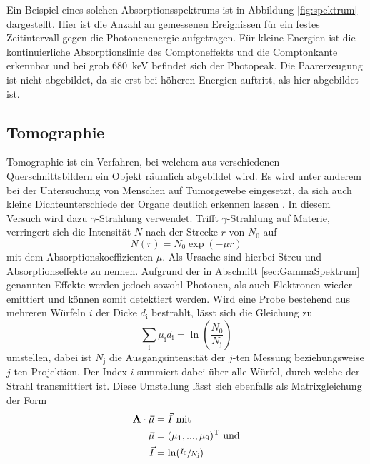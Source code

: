 Ein Beispiel eines solchen Absorptionsspektrums ist in Abbildung \ref{fig:spektrum}
dargestellt. Hier ist die Anzahl an gemessenen Ereignissen für ein
festes Zeitintervall gegen die Photonenenergie aufgetragen.
Für kleine Energien ist die kontinuierliche Absorptionslinie des Comptoneffekts
und die Comptonkante erkennbar und bei grob \SI{680}{\kilo\electronvolt}
befindet sich der Photopeak. Die Paarerzeugung ist nicht abgebildet,
da sie erst bei höheren Energien auftritt, als hier abgebildet ist.


\subsection{Tomographie}
\label{sec:Tomographie}

Tomographie ist ein Verfahren, bei welchem aus verschiedenen
Querschnittsbildern ein Objekt räumlich abgebildet wird.
Es wird unter anderem bei der Untersuchung von Menschen auf Tumorgewebe eingesetzt,
da sich auch kleine Dichteunterschiede der Organe deutlich erkennen lassen \cite{paradisi}.
In diesem Versuch wird dazu $\gamma$-Strahlung verwendet.
Trifft $\gamma$-Strahlung auf Materie, verringert sich die Intensität $N$
nach der Strecke $r$ von $N_0$ auf
\begin{equation*}
  N\left(r\right) = N_0 \exp\left(-\mu r\right)
\end{equation*}
mit dem Absorptionskoeffizienten $\mu$.
Als Ursache sind hierbei Streu und -Absorptionseffekte zu nennen.
Aufgrund der in Abschnitt \ref{sec:GammaSpektrum} genannten Effekte werden
jedoch sowohl Photonen, als auch Elektronen wieder emittiert und können
somit detektiert werden.
Wird eine Probe bestehend aus
mehreren Würfeln $i$ der Dicke $d_\text{i}$ bestrahlt, lässt sich
die Gleichung zu
\begin{equation*}
  \sum_\text{i} \mu_\text{i} d_\text{i} = \ln\left(\frac{N_0}{N_\text{j}}\right)
\end{equation*}
umstellen, dabei ist $N_\text{j}$ die Ausgangsintensität der $j$-ten Messung
beziehungsweise $j$-ten Projektion.
Der Index $i$ summiert dabei über alle Würfel, durch welche der Strahl
transmittiert ist.
Diese Umstellung lässt sich ebenfalls als Matrixgleichung der
Form
\begin{equation}
  \begin{aligned}
    \mathbf{A} \cdot \vec{\mu} &= \vec{I} \text{ mit} \\
    \vec{\mu} &= (\mu_1,...,\mu_9)^\text{T} \text{ und} \\
    \vec{I} &= \ln(\sfrac{I_0}{N_\text{j}})
  \end{aligned}
  \label{eqn:matrixform}
\end{equation}
